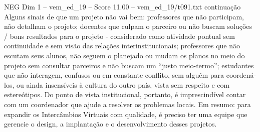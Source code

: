 \begin{textsample}{NEG Dim 1 – vem\_ed\_19 – Score 11.00 – vem\_ed\_19/t091.txt}  \label{ex:f1_neg_140}
continuação Alguns sinais de que um projeto não vai bem: professores que não participam, não detalham o projeto; docentes que culpam o parceiro ou não buscam soluções / bons resultados para o projeto - considerado como atividade pontual sem continuidade e sem visão das relações interinstitucionais; professores que não escutam seus alunos, não seguem o planejado ou mudam os planos no meio do projeto sem consultar parceiros e não buscam um “justo meio-termo”; estudantes que não interagem, confusos ou em constante conflito, sem alguém para coordená-los, ou ainda insensíveis à cultura do outro país, vista sem respeito e com estereótipos.
Do ponto de vista institucional, portanto, é imprescindível contar com um coordenador que ajude a resolver os problemas locais.
Em resumo: para expandir os Intercâmbios Virtuais com qualidade, é preciso ter uma equipe que gerencie o design, a implantação e o desenvolvimento desses projetos.

\end{textsample}
